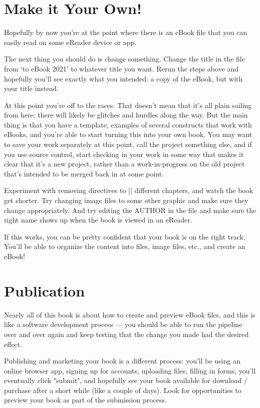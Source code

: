 \section{Make it Your Own!}

Hopefully by now you're at the point where there is an eBook file that you can easily read on some eReader device or app. 

The next thing you should do is change something. Change the title in the  file from `\latex to eBook 2021'
to whatever title you want. Rerun the steps above and hopefully you'll see exactly what you intended: a copy of the eBook, but with
your title instead.

At this point you're off to the races. That doesn't mean that it's all plain sailing from here: there will likely be glitches and hurdles along the way.
But the main thing is that you have a template, examples of several \latex constructs that work with eBooks, and you're able to start turning this
into your own book. You may want to save your work separately at this point, call the project something else, and if you use source control,
start checking in your work in some way that makes it clear that it's a new project, rather than a work-in-progress on the old project that's intended to be
merged back in at some point.

Experiment with removing directives to \sverb|| different chapters, and watch the book get shorter. Try changing image files to some other graphic
and make sure they change appropriately. And try editing the AUTHOR in the  file and make sure the right name shows up when the book is viewed in an eReader.

If this works, you can be pretty confident that your book is on the right track. You'll be able to organize the content into \tex files, image files, etc., and create an eBook!


\section{Publication}

Nearly all of this book is about how to create and preview eBook files, and this is like a software development process
--- you should be able to run the pipeline over and over again and keep testing that the change you made had the desired effect.

Publishing and marketing your book is a different process: you'll be using an online browser app, signing up for accounts, uploading files, filling in forms,
you'll eventually click "submit", and hopefully see your book available for download / purchase after a short while (like a couple of days).
Look for opportunities to preview your book as part of the submission process.

